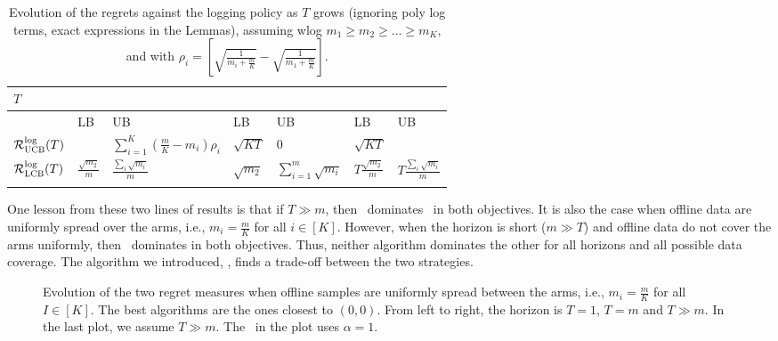 \begin{table}[htb]
\begin{center}
\renewcommand{\arraystretch}{1.4}
\begin{tabular}{>{\centering\arraybackslash}m{1.5cm} | |>{\centering\arraybackslash}m{1.5cm}|>{\centering\arraybackslash}m{1.5cm} |>{\centering\arraybackslash}m{}|>{\centering\arraybackslash}m{2cm}  |>{\centering\arraybackslash}m{1.5cm}|>{\centering\arraybackslash}m{1.5cm} }
 \toprule
 $T$ & \multicolumn{2}{c|}{$1$}&\multicolumn{2}{c|}{$T=m$} &\multicolumn{2}{c}{$T\gg m$ } \\ 
  \cline{2-7}
    & LB & UB  &LB & UB&LB & UB\\
     \hline
     \hline
\addlinespace
 $\mathcal{R}^{\text{log}}_\textsc{UCB}(T)$ & \multicolumn{2}{c|}{$\sqrt{\frac{1}{\min_i m_i}}$} & {\small $\sum_{i=1}^K\left(\frac{m}{K}-m_i\right)\rho_i$}&$\sqrt{KT}$& $0$&$\sqrt{KT}$ \\ 
 \addlinespace
  \hline
\addlinespace
 $\mathcal{R}^{\text{log}}_\textsc{LCB}(T)$ & $\frac{\sqrt{m_2}}{m}$&$\frac{\sum_{i}\sqrt{m_i}}{m} $ &  $\sqrt{m_2}$ & $\sum_{i=1}^m\sqrt{m_i}$&$T\frac{\sqrt{m_2}}{m}$&$T\frac{\sum_{i}\sqrt{m_i}}{m} $\\ 
 \addlinespace
 \hline
\end{tabular}
\end{center}
\vspace{0.2cm}
\caption{Evolution of the regrets against the logging policy as $T$ grows (ignoring poly log terms, exact expressions in the Lemmas), assuming wlog $m_1\geq m_2\geq \ldots\geq m_K$, and with $\rho_i=\left[\sqrt{\frac{1}{m_i+\frac{m}{K}}}-\sqrt{\frac{1}{m_1+\frac{m}{K}}}\right]$.}
\label{fig:regretlogging}
\end{table}

One lesson from these two lines of results is that if $T\gg m$, then \algucb\ dominates \alglcb\ in both objectives. It is also the case when offline data are uniformly spread over the arms, i.e., $m_i=\frac{m}{K}$ for all $i \in [K]$. However, when the horizon is short ($m\gg T$) and offline data do not cover the arms uniformly, then \alglcb\ dominates \algucb in both objectives. Thus, neither algorithm dominates the other for all horizons and all possible data coverage. The algorithm we introduced, \algoname, finds a trade-off between the two strategies.

\begin{figure}[htb]
\begin{center}
  \caption{Evolution of the two regret measures when offline samples are uniformly spread between the arms, i.e., $m_i=\frac{m}{K}$ for all $ I \in [K]$. The best algorithms are the ones closest to $(0,0)$. From left to right, the horizon is $T=1$, $T=m$ and $T\gg m. $ In the last plot, we assume $T\gg m$. The \algoname\ in the plot uses $\alpha=1$.}
\label{fig:tradeoffucblcbbanlanced}
\end{center}
\end{figure}

